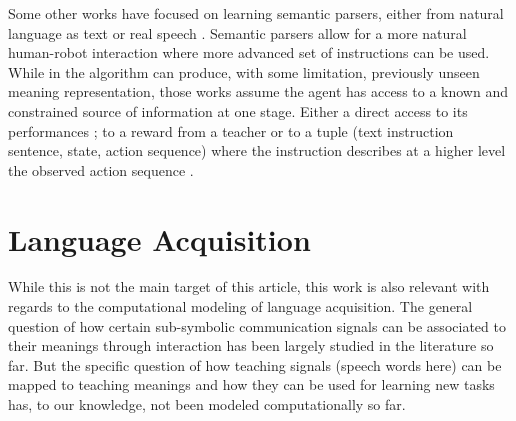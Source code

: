 Some other works have focused on learning semantic parsers, either from natural language as text \cite{branavan2011learning,kim2012unsupervised} or real speech \cite{doshi2008spoken}. Semantic parsers allow for a more natural human-robot interaction where more advanced set of instructions can be used. While in \cite{kim2012unsupervised} the algorithm can produce, with some limitation, previously unseen meaning representation, those works assume the agent has access to a known and constrained source of information at one stage. Either a direct access to its performances \cite{branavan2011learning}; to a reward from a teacher \cite{doshi2008spoken} or to a tuple (text instruction sentence, state, action sequence) where the instruction describes at a higher level the observed action sequence \cite{kim2012unsupervised}.

\section{Language Acquisition}
\label{chapter:related:language}

While this is not the main target of this article, this work is also relevant with regards to the computational modeling of language acquisition. The general question of how certain sub-symbolic communication signals can be associated to their meanings through interaction has been largely studied in the literature so far. But the specific question of how teaching signals (speech words here) can be mapped to teaching meanings and how they can be used for learning new tasks has, to our knowledge, not been modeled computationally so far. 


